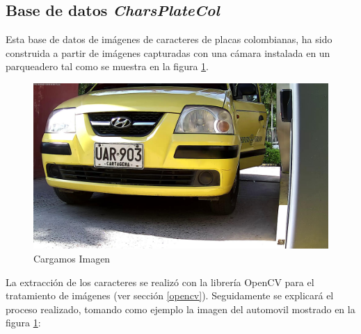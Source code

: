 

\subsection{Base de datos \textit{CharsPlateCol}} \label{CharsPlateCol2.5k}

Esta base de datos de imágenes de caracteres de placas colombianas, ha sido construida a partir de imágenes capturadas con una cámara instalada en un parqueadero tal como se muestra en la figura \ref{fig:imagen completa}. 

\begin{figure}[H]
\centering
\includegraphics[width=0.7\linewidth]{imagenes/MODELO_4/segmentacion/carro4.jpg} 
\caption{ Cargamos Imagen}
\label{fig:imagen completa}
\end{figure}

La extracción de los caracteres se realizó con la librería OpenCV para el tratamiento de imágenes (ver sección \ref{opencv}). Seguidamente se explicará el proceso realizado, tomando como ejemplo la imagen del automovil mostrado en la figura \ref{fig:imagen completa}:    

